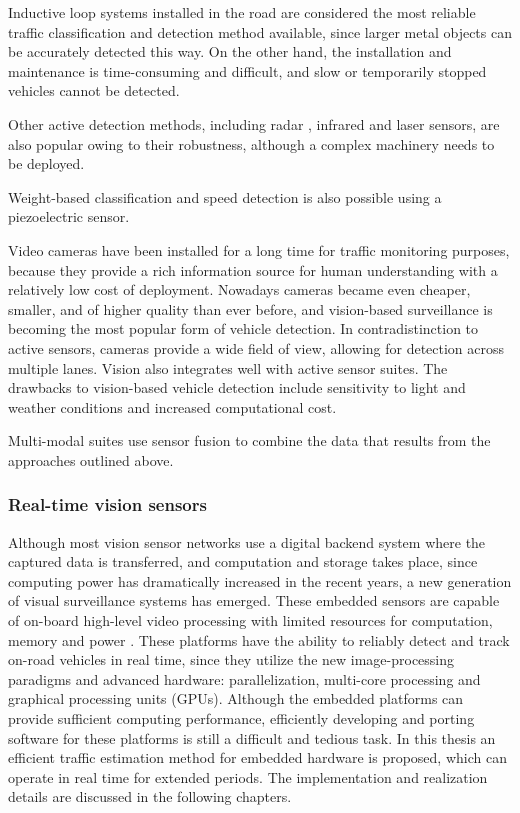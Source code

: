 Inductive loop systems installed in the road are considered the most reliable traffic classification and detection method available, since larger metal objects can be accurately detected this way. 
On the other hand, the installation and maintenance is time-consuming and difficult, and slow or temporarily stopped vehicles cannot be detected\cite{Diamond, Zhang2016}.

Other active detection methods, including radar \cite{DeepBlue}, infrared\cite{Swarco, Hussain1995, Ghazal2016} and laser\cite{SICK, Gallego2009} sensors, are also popular owing to their robustness, although a complex machinery needs to be deployed.

Weight-based classification and speed detection is also possible using a piezoelectric sensor\cite{Te, Rivas2017}.

Video cameras have been installed for a long time for traffic monitoring purposes, because they provide a rich information source for human understanding with a relatively low cost of deployment\cite{Tian2011, Buch2011, VideoSurveillance, LaSemaforica}.
Nowadays cameras became even cheaper, smaller, and of higher quality than ever before, and vision-based surveillance is becoming the most popular form of vehicle detection.
In contradistinction to active sensors, cameras provide a wide field of view, allowing for detection across multiple lanes. 
Vision also integrates well with active sensor suites\cite{Garcia2012}.
The drawbacks to vision-based vehicle detection include sensitivity to light and weather conditions and increased computational cost\cite{Shivaraman2013}.

Multi-modal suites use sensor fusion to combine the data that results from the approaches outlined above\cite{Swarco}.

\subsubsection{Real-time vision sensors}
Although most vision sensor networks use a digital backend system where the captured data is transferred, and computation and storage takes place, since computing power has dramatically increased in the recent years, a new generation of visual surveillance systems has emerged.
These embedded sensors are capable of on-board high-level video processing with limited resources for computation, memory and power \cite{Bramberger2004}.
These platforms have the ability to reliably detect and track on-road vehicles in real time, since they utilize the new image-processing paradigms and advanced hardware: parallelization, multi-core processing and graphical processing units (GPUs)\cite{Sivaraman2013}.
Although the embedded platforms can provide sufficient computing performance, efficiently developing and porting software for these platforms is still a difficult and tedious task\cite{Bramberger2004}.
In this thesis an efficient traffic estimation method for embedded hardware is proposed, which can operate in real time for extended periods.
The implementation and realization details are discussed in the following chapters.

